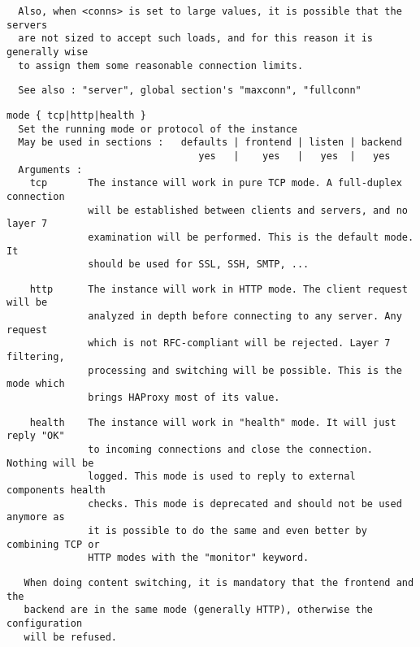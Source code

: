 \begin{verbatim}
  Also, when <conns> is set to large values, it is possible that the servers
  are not sized to accept such loads, and for this reason it is generally wise
  to assign them some reasonable connection limits.
\end{verbatim}

\begin{verbatim}
  See also : "server", global section's "maxconn", "fullconn"
\end{verbatim}

\begin{verbatim}
mode { tcp|http|health }
  Set the running mode or protocol of the instance
  May be used in sections :   defaults | frontend | listen | backend
                                 yes   |    yes   |   yes  |   yes
  Arguments :
    tcp       The instance will work in pure TCP mode. A full-duplex connection
              will be established between clients and servers, and no layer 7
              examination will be performed. This is the default mode. It
              should be used for SSL, SSH, SMTP, ...
\end{verbatim}

\begin{verbatim}
    http      The instance will work in HTTP mode. The client request will be
              analyzed in depth before connecting to any server. Any request
              which is not RFC-compliant will be rejected. Layer 7 filtering,
              processing and switching will be possible. This is the mode which
              brings HAProxy most of its value.
\end{verbatim}

\begin{verbatim}
    health    The instance will work in "health" mode. It will just reply "OK"
              to incoming connections and close the connection. Nothing will be
              logged. This mode is used to reply to external components health
              checks. This mode is deprecated and should not be used anymore as
              it is possible to do the same and even better by combining TCP or
              HTTP modes with the "monitor" keyword.
\end{verbatim}

\begin{verbatim}
   When doing content switching, it is mandatory that the frontend and the
   backend are in the same mode (generally HTTP), otherwise the configuration
   will be refused.
\end{verbatim}

